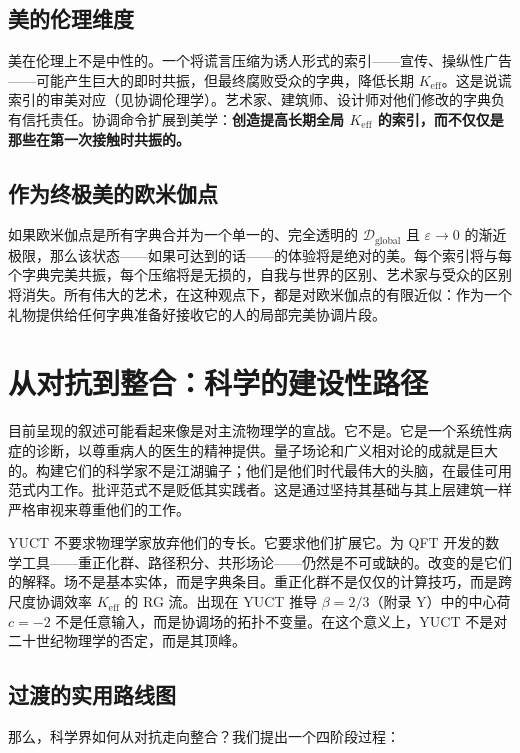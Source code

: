 \documentclass[12pt,a4paper]{article}
\begin{document}
	\subsection{美的伦理维度}
	
	美在伦理上不是中性的。一个将谎言压缩为诱人形式的索引——宣传、操纵性广告——可能产生巨大的即时共振，但最终腐败受众的字典，降低长期 \(K_{\mathrm{eff}}\)。这是说谎索引的审美对应（见协调伦理学）。艺术家、建筑师、设计师对他们修改的字典负有信托责任。协调命令扩展到美学：\textbf{创造提高长期全局 \(K_{\mathrm{eff}}\) 的索引，而不仅仅是那些在第一次接触时共振的。}
	
	\subsection{作为终极美的欧米伽点}
	
	如果欧米伽点是所有字典合并为一个单一的、完全透明的 \(\mathcal{D}_{\text{global}}\) 且 \(\varepsilon \to 0\) 的渐近极限，那么该状态——如果可达到的话——的体验将是绝对的美。每个索引将与每个字典完美共振，每个压缩将是无损的，自我与世界的区别、艺术家与受众的区别将消失。所有伟大的艺术，在这种观点下，都是对欧米伽点的有限近似：作为一个礼物提供给任何字典准备好接收它的人的局部完美协调片段。
	
	\section{从对抗到整合：科学的建设性路径}
	
	目前呈现的叙述可能看起来像是对主流物理学的宣战。它不是。它是一个系统性病症的诊断，以尊重病人的医生的精神提供。量子场论和广义相对论的成就是巨大的。构建它们的科学家不是江湖骗子；他们是他们时代最伟大的头脑，在最佳可用范式内工作。批评范式不是贬低其实践者。这是通过坚持其基础与其上层建筑一样严格审视来尊重他们的工作。
	
	YUCT 不要求物理学家放弃他们的专长。它要求他们扩展它。为 QFT 开发的数学工具——重正化群、路径积分、共形场论——仍然是不可或缺的。改变的是它们的解释。场不是基本实体，而是字典条目。重正化群不是仅仅的计算技巧，而是跨尺度协调效率 \(K_{\mathrm{eff}}\) 的 RG 流。出现在 YUCT 推导 \(\beta = 2/3\)（附录 Y）中的中心荷 \(c = -2\) 不是任意输入，而是协调场的拓扑不变量。在这个意义上，YUCT 不是对二十世纪物理学的否定，而是其顶峰。
	
	\subsection{过渡的实用路线图}
	
	那么，科学界如何从对抗走向整合？我们提出一个四阶段过程：
	
\end{document}
